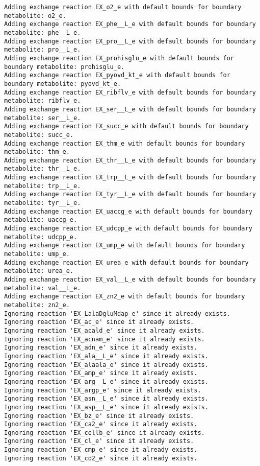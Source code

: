 \documentclass[
  letterpaper,
  DIV=11,
  numbers=noendperiod]{scrartcl}
\begin{document}
\begin{verbatim}
Adding exchange reaction EX_o2_e with default bounds for boundary metabolite: o2_e.
Adding exchange reaction EX_phe__L_e with default bounds for boundary metabolite: phe__L_e.
Adding exchange reaction EX_pro__L_e with default bounds for boundary metabolite: pro__L_e.
Adding exchange reaction EX_prohisglu_e with default bounds for boundary metabolite: prohisglu_e.
Adding exchange reaction EX_pyovd_kt_e with default bounds for boundary metabolite: pyovd_kt_e.
Adding exchange reaction EX_ribflv_e with default bounds for boundary metabolite: ribflv_e.
Adding exchange reaction EX_ser__L_e with default bounds for boundary metabolite: ser__L_e.
Adding exchange reaction EX_succ_e with default bounds for boundary metabolite: succ_e.
Adding exchange reaction EX_thm_e with default bounds for boundary metabolite: thm_e.
Adding exchange reaction EX_thr__L_e with default bounds for boundary metabolite: thr__L_e.
Adding exchange reaction EX_trp__L_e with default bounds for boundary metabolite: trp__L_e.
Adding exchange reaction EX_tyr__L_e with default bounds for boundary metabolite: tyr__L_e.
Adding exchange reaction EX_uaccg_e with default bounds for boundary metabolite: uaccg_e.
Adding exchange reaction EX_udcpp_e with default bounds for boundary metabolite: udcpp_e.
Adding exchange reaction EX_ump_e with default bounds for boundary metabolite: ump_e.
Adding exchange reaction EX_urea_e with default bounds for boundary metabolite: urea_e.
Adding exchange reaction EX_val__L_e with default bounds for boundary metabolite: val__L_e.
Adding exchange reaction EX_zn2_e with default bounds for boundary metabolite: zn2_e.
Ignoring reaction 'EX_LalaDgluMdap_e' since it already exists.
Ignoring reaction 'EX_ac_e' since it already exists.
Ignoring reaction 'EX_acald_e' since it already exists.
Ignoring reaction 'EX_acnam_e' since it already exists.
Ignoring reaction 'EX_adn_e' since it already exists.
Ignoring reaction 'EX_ala__L_e' since it already exists.
Ignoring reaction 'EX_alaala_e' since it already exists.
Ignoring reaction 'EX_amp_e' since it already exists.
Ignoring reaction 'EX_arg__L_e' since it already exists.
Ignoring reaction 'EX_argp_e' since it already exists.
Ignoring reaction 'EX_asn__L_e' since it already exists.
Ignoring reaction 'EX_asp__L_e' since it already exists.
Ignoring reaction 'EX_bz_e' since it already exists.
Ignoring reaction 'EX_ca2_e' since it already exists.
Ignoring reaction 'EX_cellb_e' since it already exists.
Ignoring reaction 'EX_cl_e' since it already exists.
Ignoring reaction 'EX_cmp_e' since it already exists.
Ignoring reaction 'EX_co2_e' since it already exists.

\end{verbatim}
\end{document}
